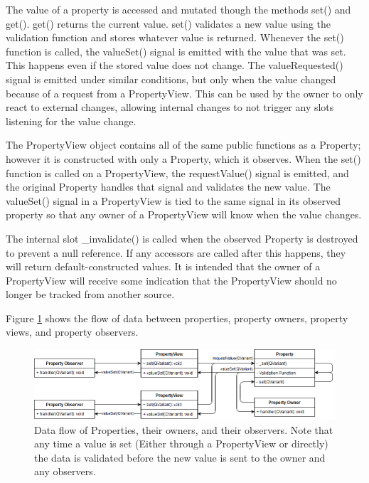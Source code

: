  	The value of a property is accessed and mutated though the methods set() and get(). get() returns the current value. set() validates a new value using the validation function and stores whatever value is returned. Whenever the set() function is called, the valueSet() signal is emitted with the value that was set. This happens even if the stored value does not change. The valueRequested() signal is emitted under similar conditions, but only when the value changed because of a request from a PropertyView. This can be used by the owner to only react to external changes, allowing internal changes to not trigger any slots listening for the value change.
 	
 	The PropertyView object contains all of the same public functions as a Property; however it is constructed with only a Property, which it observes. When the set() function is called on a PropertyView, the requestValue() signal is emitted, and the original Property handles that signal and validates the new value. The valueSet() signal in a PropertyView is tied to the same signal in its observed property so that any owner of a PropertyView will know when the value changes.
 	
 	The internal slot \_invalidate() is called when the observed Property is destroyed to prevent a null reference. If any accessors are called after this happens, they will return default-constructed values. It is intended that the owner of a PropertyView will receive some indication that the PropertyView should no longer be tracked from another source.
 	
 	Figure \ref{uml:dataflow_property} shows the flow of data between properties, property owners, property views, and property observers.
 	
 \begin{figure}[h]
 	\begin{center}
 	\includegraphics[scale=0.5]{./images_design/uml/DataFlow_Property}
 	\caption{Data flow of Properties, their owners, and their observers. Note that any time a value is set (Either through a PropertyView or directly) the data is validated before the new value is sent to the owner and any observers.\label{uml:dataflow_property}}
 	\end{center}
 \end{figure} 
 	
